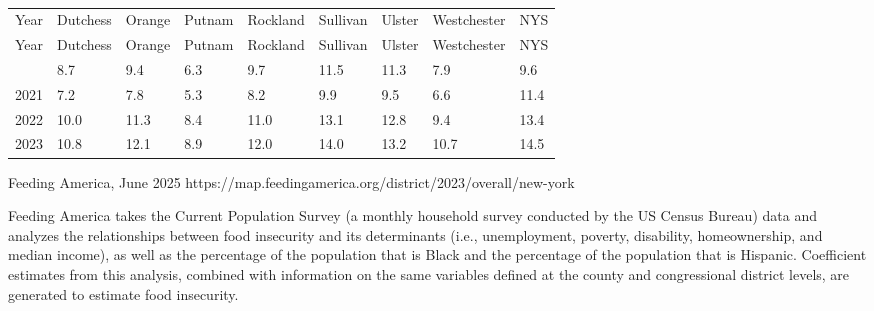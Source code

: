 \documentclass[
  english,
  letterpaper,
]{report}
\begin{document}
\begin{longtable}[]{@{}lllllllll@{}}

\caption{\label{tbl-food-insecurity}Percentage of Overall Food
Insecurity, 2020--2023}

\tabularnewline

\caption{}\label{T_79c44}\tabularnewline
\toprule\noalign{}
Year & Dutchess & Orange & Putnam & Rockland & Sullivan & Ulster &
Westchester & NYS \\
\midrule\noalign{}
\endfirsthead
\toprule\noalign{}
Year & Dutchess & Orange & Putnam & Rockland & Sullivan & Ulster &
Westchester & NYS \\
\midrule\noalign{}
\endhead
\bottomrule\noalign{}
\endlastfoot
2020 & 8.7 & 9.4 & 6.3 & 9.7 & 11.5 & 11.3 & 7.9 & 9.6 \\
2021 & 7.2 & 7.8 & 5.3 & 8.2 & 9.9 & 9.5 & 6.6 & 11.4 \\
2022 & 10.0 & 11.3 & 8.4 & 11.0 & 13.1 & 12.8 & 9.4 & 13.4 \\
2023 & 10.8 & 12.1 & 8.9 & 12.0 & 14.0 & 13.2 & 10.7 & 14.5 \\

\end{longtable}

\begin{tcolorbox}[enhanced jigsaw, breakable, leftrule=.75mm, title=\textcolor{quarto-callout-note-color}{\faInfo}\hspace{0.5em}{Source}, bottomrule=.15mm, opacityback=0, left=2mm, colback=white, bottomtitle=1mm, coltitle=black, colbacktitle=quarto-callout-note-color!10!white, colframe=quarto-callout-note-color-frame, opacitybacktitle=0.6, toptitle=1mm, titlerule=0mm, arc=.35mm, rightrule=.15mm, toprule=.15mm]

Feeding America, June 2025
https://map.feedingamerica.org/district/2023/overall/new-york

\end{tcolorbox}

\begin{tcolorbox}[enhanced jigsaw, breakable, leftrule=.75mm, title=\textcolor{quarto-callout-note-color}{\faInfo}\hspace{0.5em}{Note}, bottomrule=.15mm, opacityback=0, left=2mm, colback=white, bottomtitle=1mm, coltitle=black, colbacktitle=quarto-callout-note-color!10!white, colframe=quarto-callout-note-color-frame, opacitybacktitle=0.6, toptitle=1mm, titlerule=0mm, arc=.35mm, rightrule=.15mm, toprule=.15mm]

Feeding America takes the Current Population Survey (a monthly household
survey conducted by the US Census Bureau) data and analyzes the
relationships between food insecurity and its determinants (i.e.,
unemployment, poverty, disability, homeownership, and median income), as
well as the percentage of the population that is Black and the
percentage of the population that is Hispanic. Coefficient estimates
from this analysis, combined with information on the same variables
defined at the county and congressional district levels, are generated
to estimate food insecurity.

\end{tcolorbox}
\end{document}
